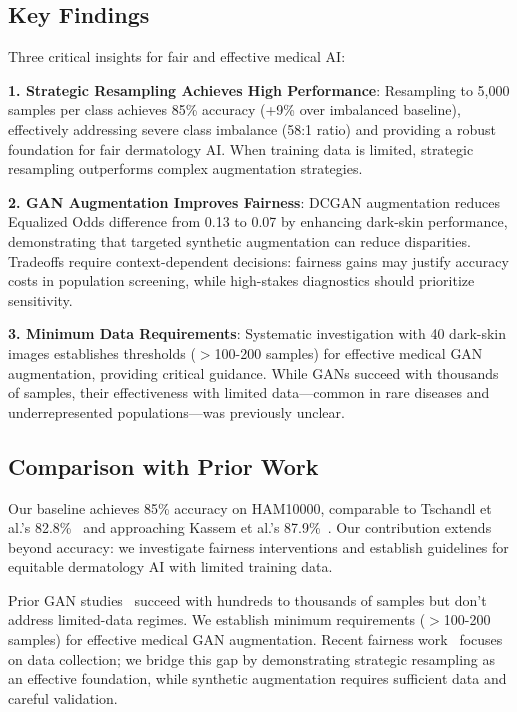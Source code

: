 \documentclass[10pt, twocolumn, letterpaper]{article}
\begin{document}
\subsection{Key Findings}
Three critical insights for fair and effective medical AI:

\textbf{1. Strategic Resampling Achieves High Performance}: Resampling to 5,000 samples per class achieves 85\% accuracy (+9\% over imbalanced baseline), effectively addressing severe class imbalance (58:1 ratio) and providing a robust foundation for fair dermatology AI. When training data is limited, strategic resampling outperforms complex augmentation strategies.

\textbf{2. GAN Augmentation Improves Fairness}: DCGAN augmentation reduces Equalized Odds difference from 0.13 to 0.07 by enhancing dark-skin performance, demonstrating that targeted synthetic augmentation can reduce disparities. Tradeoffs require context-dependent decisions: fairness gains may justify accuracy costs in population screening, while high-stakes diagnostics should prioritize sensitivity.

\textbf{3. Minimum Data Requirements}: Systematic investigation with 40 dark-skin images establishes thresholds ($>$100-200 samples) for effective medical GAN augmentation, providing critical guidance. While GANs succeed with thousands of samples, their effectiveness with limited data—common in rare diseases and underrepresented populations—was previously unclear.

\subsection{Comparison with Prior Work}
Our baseline achieves 85\% accuracy on HAM10000, comparable to Tschandl et al.'s 82.8\%~\cite{tschandl2018} and approaching Kassem et al.'s 87.9\%~\cite{kassem2020}. Our contribution extends beyond accuracy: we investigate fairness interventions and establish guidelines for equitable dermatology AI with limited training data.

Prior GAN studies~\cite{frid2018, shaban2019} succeed with hundreds to thousands of samples but don't address limited-data regimes. We establish minimum requirements ($>$100-200 samples) for effective medical GAN augmentation. Recent fairness work~\cite{daneshjou2022, kinyanjui2020} focuses on data collection; we bridge this gap by demonstrating strategic resampling as an effective foundation, while synthetic augmentation requires sufficient data and careful validation.
\end{document}
